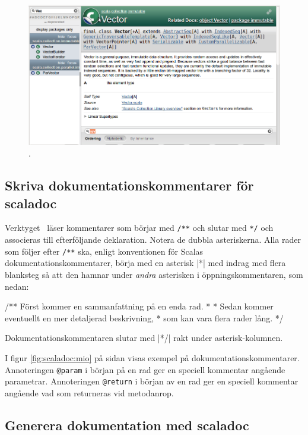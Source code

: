 \begin{figure}[H]
\centering
\includegraphics[width=1.0\textwidth]{../img/scaladoc/scaladoc-vec}

     \caption{ \scaladoc.}
    \label{fig:scaladoc:vector}
\end{figure}


\subsection{Skriva dokumentationskommentarer för scaladoc}


Verktyget \scaladoc~läser kommentarer som börjar med \verb|/**| och slutar med \verb|*/| och associeras till efterföljande deklaration. Notera de dubbla asteriskerna. Alla rader som följer efter \verb|/**| ska, enligt konventionen för Scalas dokumentationskommentarer, börja med en asterisk \code|*| med indrag med flera blanksteg så att den hamnar under \textit{andra} asterisken i öppningskommentaren, som nedan:
\begin{Code}
/** Först kommer en sammanfattning på en enda rad. 
  * 
  * Sedan kommer eventuellt en mer detaljerad beskrivning, 
  * som kan vara flera rader lång.
  */
\end{Code}
Dokumentationskommentaren slutar med \code|*/| rakt under asterisk-kolumnen.

I figur \ref{fig:scaladoc:mio} på sidan \pageref{fig:scaladoc:mio} visas exempel på dokumentationskommentarer. Annoteringen \verb|@param| i början på en rad ger en speciell kommentar angående parametrar. Annoteringen \verb|@return| i början av en rad ger en speciell kommentar angående vad som returneras vid metodanrop.


\subsection{Generera dokumentation med scaladoc}


